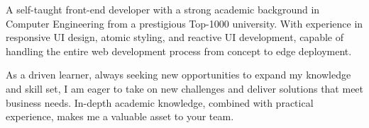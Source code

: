 
\begin{cvparagraph}
A self-taught front-end developer with a strong academic background in Computer Engineering
 from a prestigious Top-1000 university.
With experience in responsive UI design, atomic styling, and reactive UI development,
 capable of handling the entire web development process from concept to edge deployment.

As a driven learner, always seeking new opportunities to expand my knowledge and skill set,
 I am eager to take on new challenges and deliver solutions that meet business needs.
 In-depth academic knowledge, combined with practical experience, makes me a valuable asset to your team.
\end{cvparagraph}
